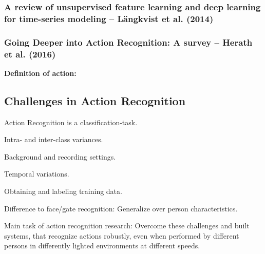 \subsubsection{A review of unsupervised feature learning and deep learning for time-series modeling -- Längkvist et al. (2014)}

\subsubsection{Going Deeper into Action Recognition: A survey -- Herath et al. (2016)}

\textbf{Definition of action:} 

\subsection{Challenges in Action Recognition}
Action Recognition is a classification-task.

Intra- and inter-class variances.

Background and recording settings.

Temporal variations.

Obtaining and labeling training data.

Difference to face/gate recognition: Generalize over person characteristics.

Main task of action recognition research: Overcome these challenges and built systems, that recognize actions robustly, even when performed by different persons in differently lighted environments at different speeds.
